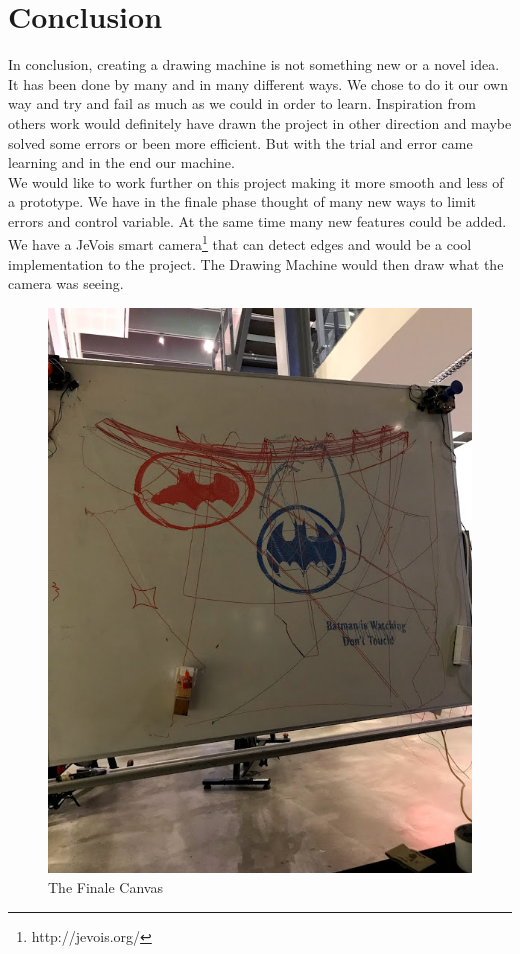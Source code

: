 
\section{Conclusion}
In conclusion, creating a drawing machine is not something new or a novel idea. It has been done by many and in many different ways. We chose to do it our own way and try and fail as much as we could in order to learn. Inspiration from others work would definitely have drawn the project in other direction and maybe solved some errors or been more efficient. But with the trial and error came learning and in the end our machine.\\
We would like to work further on this project making it more smooth and less of a prototype. We have in the finale phase thought of many new ways to limit errors and control variable. At the same time many new features could be added. We have a JeVois smart camera\footnote{http://jevois.org/} that can detect edges and would be a cool implementation to the project. The Drawing Machine would then draw what the camera was seeing.\\ 

\begin{figure}[H]
\centering
\includegraphics[scale=0.30]{Images/Jacobselskovsbilleder/IMG_2045.jpg}
\caption{ The Finale Canvas }
\label{LastCanvas}
\end{figure}